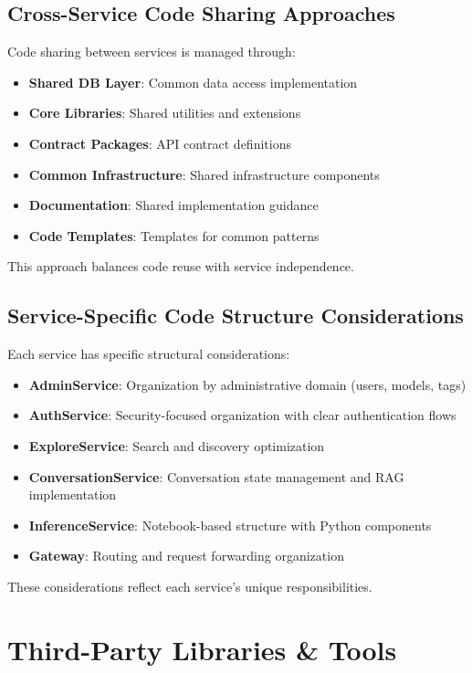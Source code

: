 \subsection{Cross-Service Code Sharing Approaches}
Code sharing between services is managed through:
\begin{itemize}
    \item \textbf{Shared DB Layer}: Common data access implementation
    \item \textbf{Core Libraries}: Shared utilities and extensions
    \item \textbf{Contract Packages}: API contract definitions
    \item \textbf{Common Infrastructure}: Shared infrastructure components
    \item \textbf{Documentation}: Shared implementation guidance
    \item \textbf{Code Templates}: Templates for common patterns
\end{itemize}

This approach balances code reuse with service independence.

\subsection{Service-Specific Code Structure Considerations}
Each service has specific structural considerations:
\begin{itemize}
    \item \textbf{AdminService}: Organization by administrative domain (users, models, tags)
    \item \textbf{AuthService}: Security-focused organization with clear authentication flows
    \item \textbf{ExploreService}: Search and discovery optimization
    \item \textbf{ConversationService}: Conversation state management and RAG implementation
    \item \textbf{InferenceService}: Notebook-based structure with Python components
    \item \textbf{Gateway}: Routing and request forwarding organization
\end{itemize}

These considerations reflect each service's unique responsibilities.

\section{Third-Party Libraries \& Tools}

